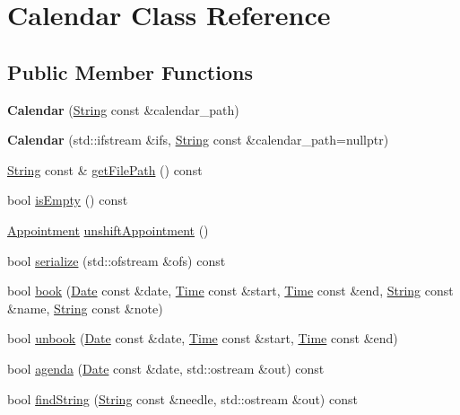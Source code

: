 \hypertarget{classCalendar}{}\section{Calendar Class Reference}
\label{classCalendar}
\subsection*{Public Member Functions}
\begin{DoxyCompactItemize}
\item 
\mbox{\label{classCalendar_a54d7e31f38979ee7a363594b86ca9419}} 
{\bfseries Calendar} (\hyperlink{classString}{String} const \&calendar\+\_\+path)
\item 
\mbox{\label{classCalendar_a346673cf7dd15ffa3a2ea292703c5421}} 
{\bfseries Calendar} (std\+::ifstream \&ifs, \hyperlink{classString}{String} const \&calendar\+\_\+path=nullptr)
\item 
\hyperlink{classString}{String} const  \& \hyperlink{classCalendar_afb5265ef3f8b820048d35dc9921d6789}{get\+File\+Path} () const
\item 
bool \hyperlink{classCalendar_a304110c0454b23f75902ddcddbe8a921}{is\+Empty} () const
\item 
\hyperlink{classAppointment}{Appointment} \hyperlink{classCalendar_a6c94f89713fac92f1544ea3f1b9a8fc9}{unshift\+Appointment} ()
\item 
bool \hyperlink{classCalendar_abd08c73fde62b83cb12afe01ff574223}{serialize} (std\+::ofstream \&ofs) const
\item 
bool \hyperlink{classCalendar_ac50220dec77b2c19f09516ea88e9398c}{book} (\hyperlink{classDate}{Date} const \&date, \hyperlink{classTime}{Time} const \&start, \hyperlink{classTime}{Time} const \&end, \hyperlink{classString}{String} const \&name, \hyperlink{classString}{String} const \&note)
\item 
bool \hyperlink{classCalendar_a24540f159572a53109a20be9ea8f4c5e}{unbook} (\hyperlink{classDate}{Date} const \&date, \hyperlink{classTime}{Time} const \&start, \hyperlink{classTime}{Time} const \&end)
\item 
bool \hyperlink{classCalendar_ac6112aa4e9b3e6e5b9a478ff66789d77}{agenda} (\hyperlink{classDate}{Date} const \&date, std\+::ostream \&out) const
\item 
bool \hyperlink{classCalendar_accc025455e06e4031b9b76fe1a35220d}{find\+String} (\hyperlink{classString}{String} const \&needle, std\+::ostream \&out) const

\end{DoxyCompactItemize}
